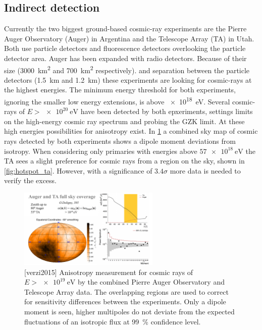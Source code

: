 \subsection{Indirect detection}


Currently the two biggest ground-based cosmic-ray experiments are the Pierre Auger Observatory (Auger) in Argentina and the Telescope Array (TA) in Utah. Both use particle detectors and fluorescence detectors overlooking the particle detector area. Auger has been expanded with radio detectors. Because of their size (\SI{3000}{\square\kilo\meter} and \SI{700}{\square\kilo\meter} respectively). and separation between the particle detectors (\SI{1.5}{\kilo\meter} and \SI{1.2}{\kilo\meter}) these experiments are looking for cosmic-rays at the highest energies. The minimum energy threshold for both experiments, ignoring the smaller low energy extensions, is above \SI{e18}{\eV}. Several cosmic-rays of $E > \SI{e20}{\eV}$ have been detected by both epxeriments, settings limits on the high-energy cosmic ray spectrum and probing the GZK limit. At these high energies possibilities for anisotropy exist. In \cref{fig:skymap_ta_auger} a combined sky map of cosmic rays detected by both experiments shows a dipole moment deviations from isotropy. When considering only primaries with energies above $\SI{57e18}{\eV}$ the TA sees a slight preference for cosmic rays from a region on the sky, shown in \cref{fig:hotspot_ta}. However, with a significance of $3.4 \sigma$ more data is needed to verify the excess.

\begin{figure}
    \centering
    \includegraphics[width=0.6\textwidth]
                    {plots/cosmic-rays/skymap_ta_auger}
    \caption{[verzi2015] Anisotropy measurement for cosmic rays of $E > \SI{e19}{\eV}$ by the combined Pierre Auger Observatory and Telescope Array data. The overlapping regions are used to correct for sensitivity differences between the experiments. Only a dipole moment is seen, higher multipoles do not deviate from the expected fluctuations of an isotropic flux at \SI{99}{\percent} confidence level.}
    \label{fig:skymap_ta_auger}
\end{figure}

